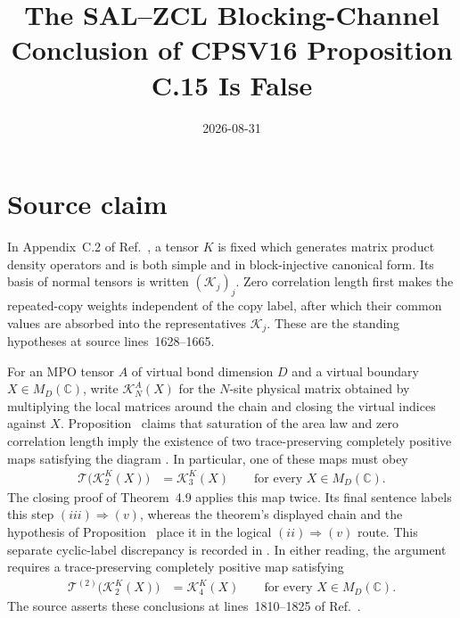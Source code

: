 \documentclass{article}
\title{The SAL--ZCL Blocking-Channel Conclusion of CPSV16 Proposition C.15 Is False}
\author{}
\date{2026-08-31}
\begin{document}
\maketitle
{}

\section{Source claim}

In Appendix~C.2 of Ref.~\cite{Cirac2016MPDO_arXiv}, a tensor $K$ is fixed
which generates matrix product density operators and is both simple and in
block-injective canonical form. Its basis of normal tensors is written
$(\mathcal K_j)_j$. Zero correlation length first makes the repeated-copy
weights independent of the copy label, after which their common values are
absorbed into the representatives $\mathcal K_j$. These are the standing
hypotheses at source lines~1628--1665.

For an MPO tensor $A$ of virtual bond dimension $D$ and a virtual boundary
$X\in M_D(\mathbb C)$, write $\mathcal K_N^A(X)$ for the $N$-site physical
matrix obtained by multiplying the local matrices around the chain and
closing the virtual indices against $X$. Proposition~
claims that saturation of the area law and zero correlation length imply the
existence of two trace-preserving completely positive maps satisfying the
diagram . In particular, one of these maps must obey
\begin{align}
    \mathcal T\bigl(\mathcal K_2^K(X)\bigr)
        &= \mathcal K_3^K(X)
        \qquad\text{for every }X\in M_D(\mathbb C).
    \label{eq:cpsv16_prop_c15_blocking_channel_false_two_to_three}
\end{align}
The closing proof of Theorem~4.9 applies this map twice. Its final sentence
labels this step $(iii)\Rightarrow(v)$, whereas the theorem's displayed chain
and the hypothesis of Proposition~ place it in the logical
$(ii)\Rightarrow(v)$ route. This separate cyclic-label discrepancy is recorded
in .
In either reading, the argument requires a trace-preserving completely
positive map satisfying
\begin{align}
    \mathcal T^{(2)}\bigl(\mathcal K_2^K(X)\bigr)
        &= \mathcal K_4^K(X)
        \qquad\text{for every }X\in M_D(\mathbb C).
    \label{eq:cpsv16_prop_c15_blocking_channel_false_two_to_four}
\end{align}
The source asserts these conclusions at lines~1810--1825 of
Ref.~\cite{Cirac2016MPDO_arXiv}.
\end{document}
